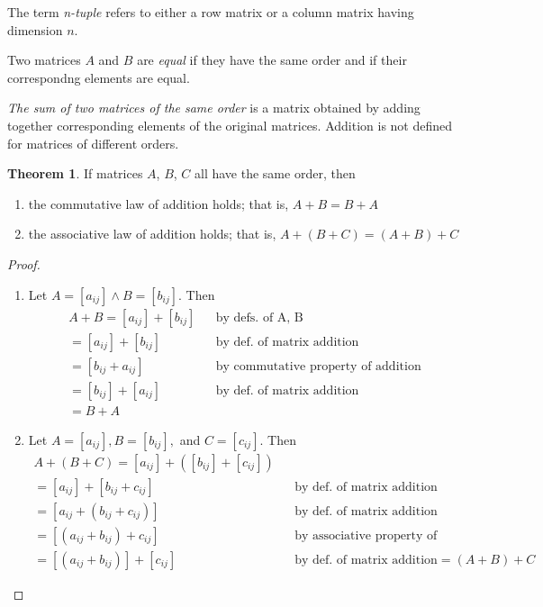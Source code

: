 \documentclass[11pt]{article}
\theoremstyle{definition}
\newtheorem{theorem}{Theorem}
\begin{document}
	The term \textit{n-tuple} refers to either a row matrix or a column matrix having dimension $n$. 
	
	Two matrices $A$ and $B$ are \textit{equal} if they have the same order and if their correspondng elements are equal.
	
	\textit{The sum of two matrices of the same order} is a matrix obtained by adding together corresponding elements of the original matrices. Addition is not defined for matrices of different orders.
	
	\begin{theorem}
		If matrices $A$, $B$, $C$ all have the same order, then 
		
		\begin{enumerate}[label=(\alph*)]
			\item the commutative law of addition holds; that is, $A + B = B + A$
			\item the associative law of addition holds; that is, $A + (B  + C) = (A + B) + C$
		\end{enumerate}
	\end{theorem}
	
	\begin{shaded}
		\begin{proof}
			\begin{enumerate}[label=(\alph*)]
				\item Let $A = [a_{ij}] \land B = [b_{ij}]$. Then
				\begin{align*}
				A + B = [a_{ij}] + [b_{ij}] && \text{by defs. of A, B} \\
				= [a_{ij}] + [b_{ij}] && \text{by def. of matrix addition} \\
				= [b_{ij} + a_{ij}] && \text{by commutative property of addition} \\
				= [b_{ij}] + [a_{ij}] && \text{by def. of matrix addition} \\
				= B + A
				\end{align*}
				
				\item Let $A = [a_{ij}], B = [b_{ij}],$ and $C = [c_{ij}]$. Then
				\begin{align*}
				A + (B + C) = [a_{ij}] + ([b_{ij}] + [c_{ij}]) \\
				= [a_{ij}] + [b_{ij} + c_{ij}] && \text{by def. of matrix addition} \\
				= [a_{ij} + (b_{ij} + c_{ij})] && \text{by def. of matrix addition} \\
				= [(a_{ij} + b_{ij}) + c_{ij}] && \text{by associative property of addition} \\
				= [(a_{ij} + b_{ij})] + [c_{ij}] && \text{by def. of matrix addition}
				= (A + B) + C
				\end{align*} 
			\end{enumerate}
		\end{proof}
	\end{shaded}
\end{document}
